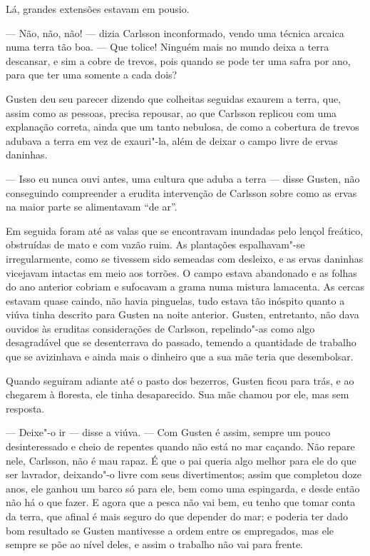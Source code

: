 Lá, grandes extensões estavam em pousio.

--- Não, não, não! --- dizia Carlsson inconformado, vendo uma técnica arcaica numa
terra tão boa. --- Que tolice! Ninguém mais no mundo deixa a terra descansar,
e sim a cobre de trevos, pois quando se pode ter uma safra por ano, para que ter
uma somente a cada dois?

Gusten deu seu parecer dizendo que colheitas seguidas exaurem a terra, que, assim como
as pessoas, precisa repousar, ao que Carlsson replicou com uma explanação
correta, ainda que um tanto nebulosa, de como a cobertura de trevos adubava a
terra em vez de exauri"-la, além de deixar o campo livre de ervas daninhas.

--- Isso eu nunca ouvi antes, uma cultura que aduba a terra --- disse Gusten, não
conseguindo compreender a erudita intervenção de Carlsson sobre como as ervas na
maior parte se alimentavam ``de ar''.

Em seguida foram até as valas que se encontravam inundadas pelo lençol freático,
obstruídas de mato e com vazão ruim. As plantações espalhavam"-se irregularmente,
como se tivessem sido semeadas com desleixo, e as ervas daninhas vicejavam
intactas em meio aos torrões. O campo estava abandonado e as folhas do ano
anterior cobriam e sufocavam a grama numa mistura lamacenta. As cercas estavam
quase caindo, não havia pinguelas, tudo estava tão inóspito quanto a viúva tinha
descrito para Gusten na noite anterior. Gusten, entretanto, não dava ouvidos às
eruditas considerações de Carlsson, repelindo"-as como algo desagradável que se
desenterrava do passado, temendo a quantidade de trabalho que se avizinhava e
ainda mais o dinheiro que a sua mãe teria que desembolsar.

Quando seguiram adiante até o pasto dos bezerros, Gusten ficou para trás, e ao
chegarem à floresta, ele tinha desaparecido. Sua mãe chamou por ele, mas sem
resposta.

--- Deixe"-o ir --- disse a viúva. --- Com Gusten é assim, sempre um pouco
desinteressado e cheio de repentes quando não está no mar caçando. Não repare
nele, Carlsson, não é mau rapaz. É que o pai queria algo melhor para ele do
que ser lavrador, deixando"-o livre com seus divertimentos; assim que completou
doze anos, ele ganhou um barco só para ele, bem como uma espingarda, e desde
então não há o que fazer. E agora que a pesca não vai bem, eu tenho que
tomar conta da terra, que afinal é mais seguro do que depender do mar; e
poderia ter dado bom resultado se Gusten mantivesse a ordem entre os empregados,
mas ele sempre se põe ao nível deles, e assim o trabalho não vai para frente.

